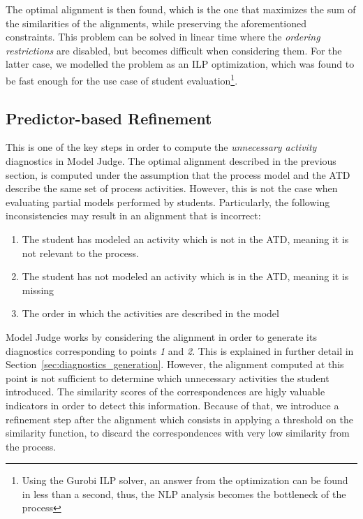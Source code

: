 The optimal alignment is then found, which is the one that maximizes the sum of
the similarities of the alignments, while preserving the aforementioned
constraints. This problem can be solved in linear time where the \emph{ordering
  restrictions} are disabled, but becomes difficult when considering them. For
the latter case, we modelled the problem as an ILP optimization, which was found
to be fast enough for the use case of student evaluation\footnote{Using the
  Gurobi\cite{gurobi} ILP solver, an answer from the optimization can be found
  in less than a second, thus, the NLP analysis becomes the bottleneck of the
  process}.

\subsection{Predictor-based Refinement}
\label{sec:predictors}

This is one of the key steps in order to compute the \emph{unnecessary activity}
diagnostics in Model Judge. The optimal alignment described in the
previous section, is computed under the assumption that the process model and
the ATD describe the same set of process activities. However, this is not the
case when evaluating partial models performed by students. Particularly, the
following inconsistencies may result in an alignment that is incorrect:

\begin{enumerate}
  \item The student has modeled an activity which is not in the ATD, meaning it
    is not relevant to the process.
  \item The student has not modeled an activity which is in the ATD, meaning it
    is missing 
  \item The order in which the activities are described in the model 
\end{enumerate}

Model Judge works by considering the alignment in order to generate
its diagnostics corresponding to points \emph{1} and \emph{2}. This is explained
in further detail in Section~\ref{sec:diagnostics_generation}. However, the
alignment computed at this point is not sufficient to determine which
unnecessary activities the student introduced. The similarity scores of the
correspondences are higly valuable indicators in order to detect this
information. Because of that, we introduce a refinement step after the alignment
which consists in applying a threshold on the similarity function, to discard
the correspondences with very low similarity from the process.

